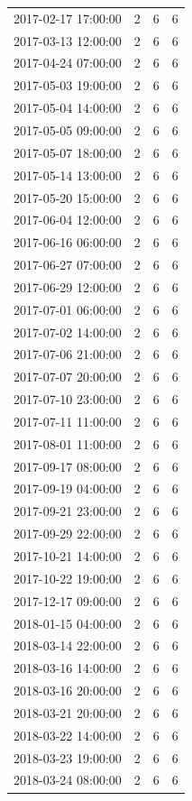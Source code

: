 \begin{tabular}{lrrr}
2017-02-17 17:00:00 & 2 & 6 & 6 \\
2017-03-13 12:00:00 & 2 & 6 & 6 \\
2017-04-24 07:00:00 & 2 & 6 & 6 \\
2017-05-03 19:00:00 & 2 & 6 & 6 \\
2017-05-04 14:00:00 & 2 & 6 & 6 \\
2017-05-05 09:00:00 & 2 & 6 & 6 \\
2017-05-07 18:00:00 & 2 & 6 & 6 \\
2017-05-14 13:00:00 & 2 & 6 & 6 \\
2017-05-20 15:00:00 & 2 & 6 & 6 \\
2017-06-04 12:00:00 & 2 & 6 & 6 \\
2017-06-16 06:00:00 & 2 & 6 & 6 \\
2017-06-27 07:00:00 & 2 & 6 & 6 \\
2017-06-29 12:00:00 & 2 & 6 & 6 \\
2017-07-01 06:00:00 & 2 & 6 & 6 \\
2017-07-02 14:00:00 & 2 & 6 & 6 \\
2017-07-06 21:00:00 & 2 & 6 & 6 \\
2017-07-07 20:00:00 & 2 & 6 & 6 \\
2017-07-10 23:00:00 & 2 & 6 & 6 \\
2017-07-11 11:00:00 & 2 & 6 & 6 \\
2017-08-01 11:00:00 & 2 & 6 & 6 \\
2017-09-17 08:00:00 & 2 & 6 & 6 \\
2017-09-19 04:00:00 & 2 & 6 & 6 \\
2017-09-21 23:00:00 & 2 & 6 & 6 \\
2017-09-29 22:00:00 & 2 & 6 & 6 \\
2017-10-21 14:00:00 & 2 & 6 & 6 \\
2017-10-22 19:00:00 & 2 & 6 & 6 \\
2017-12-17 09:00:00 & 2 & 6 & 6 \\
2018-01-15 04:00:00 & 2 & 6 & 6 \\
2018-03-14 22:00:00 & 2 & 6 & 6 \\
2018-03-16 14:00:00 & 2 & 6 & 6 \\
2018-03-16 20:00:00 & 2 & 6 & 6 \\
2018-03-21 20:00:00 & 2 & 6 & 6 \\
2018-03-22 14:00:00 & 2 & 6 & 6 \\
2018-03-23 19:00:00 & 2 & 6 & 6 \\
2018-03-24 08:00:00 & 2 & 6 & 6 \\

\end{tabular}
